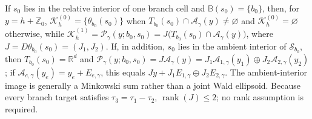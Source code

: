 If \(s_0\) lies in the relative interior of one branch cell and \(\mathbb B(s_0)=\{b_0\}\), then, for \(y=h+\mathbb Z_0\), \(\mathcal K_h^{(0)}=\{\theta_{b_0}(s_0)\}\) when \(T_{b_0}(s_0)\cap\mathcal A_{\gamma}(y)\neq\varnothing\) and \(\mathcal K_h^{(0)}=\varnothing\) otherwise, while \(\mathcal K_h^{(1)}=\mathcal P_{\gamma}(y;b_0,s_0)=J\bigl(T_{b_0}(s_0)\cap\mathcal A_{\gamma}(y)\bigr)\), where \(J=D\theta_{b_0}(s_0)=(J_1,J_2)\). If, in addition, \(s_0\) lies in the ambient interior of \(\mathcal S_{b_0}\), then \(T_{b_0}(s_0)=\mathbb R^d\) and \(\mathcal P_{\gamma}(y;b_0,s_0)=J\mathcal A_{\gamma}(y)=J_1\mathcal A_{1,\gamma}(y_1)\oplus J_2\mathcal A_{2,\gamma}(y_2)\); if \(\mathcal A_{e,\gamma}(y_e)=y_e+E_{e,\gamma}\), this equals \(Jy+J_1E_{1,\gamma}\oplus J_2E_{2,\gamma}\). The ambient-interior image is generally a Minkowski sum rather than a joint Wald ellipsoid. Because every branch target satisfies \(\tau_3=\tau_1-\tau_2\), \(\operatorname{rank}(J)\le2\); no rank assumption is required.